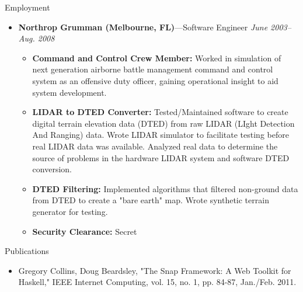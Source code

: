 \documentclass[11pt,oneside]{article}
\newenvironment{ressection}[1]{
	\vspace{4pt}
	{\fontfamily{phv}\selectfont\Large#1}
	\begin{itemize}
	\vspace{3pt}
}{
	\end{itemize}
}
\newcommand{\ressubitem}[1]{
	\vspace{-1pt}
	\item \begin{flushleft} #1 \end{flushleft}
}
\newcommand{\resbigitem}[3]{
	\vspace{-5pt}
	\item
	{\textbf{#1}---#2 \hfill \textit{#3}}
}
\newenvironment{restitledposition}[3]{
	\resbigitem{#1}{#2}{#3}
	\vspace{-2pt}
	\begin{itemize}
}{
	\end{itemize}
}
\begin{document}
\begin{ressection}{Employment}
\begin{restitledposition}{Northrop Grumman (Melbourne, FL)}{Software Engineer}{June 2003--Aug. 2008}
    \ressubitem{\textbf{Command and Control Crew Member:} Worked in
    simulation of next generation airborne battle management command
    and control system as an offensive duty officer, gaining
    operational insight to aid system development.}

    \ressubitem{\textbf{LIDAR to DTED Converter:} Tested/Maintained
    software to create digital terrain elevation data (DTED) from raw
    LIDAR (LIght Detection And Ranging) data.  Wrote LIDAR simulator
    to facilitate testing before real LIDAR data was available.
    Analyzed real data to determine the source of problems in the
    hardware LIDAR system and software DTED conversion.}

    \ressubitem{\textbf{DTED Filtering:} Implemented algorithms that
    filtered non-ground data from DTED to create a "bare earth" map.
    Wrote synthetic terrain generator for testing.}

    \ressubitem{\textbf{Security Clearance:} Secret}

	\end{restitledposition}

\end{ressection}

\begin{ressection}{Publications}
  \ressubitem{Gregory Collins, Doug Beardsley, "The Snap Framework:
A Web Toolkit for Haskell," IEEE Internet Computing, vol. 15, no. 1,
pp. 84-87, Jan./Feb. 2011.}
\end{ressection}
\end{document}
